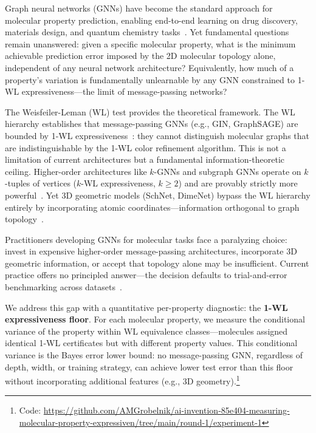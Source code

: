 \documentclass[11pt,letterpaper]{article}
\begin{document}
Graph neural networks (GNNs) have become the standard approach for molecular property prediction, enabling end-to-end learning on drug discovery, materials design, and quantum chemistry tasks~\citep{Gilmer2017}. Yet fundamental questions remain unanswered: given a specific molecular property, what is the minimum achievable prediction error imposed by the 2D molecular topology alone, independent of any neural network architecture? Equivalently, how much of a property's variation is fundamentally unlearnable by any GNN constrained to 1-WL expressiveness---the limit of message-passing networks?

The Weisfeiler-Leman (WL) test provides the theoretical framework. The WL hierarchy establishes that message-passing GNNs (e.g., GIN, GraphSAGE) are bounded by 1-WL expressiveness~\citep{Xu2019,Kipf2017}: they cannot distinguish molecular graphs that are indistinguishable by the 1-WL color refinement algorithm. This is not a limitation of current architectures but a fundamental information-theoretic ceiling. Higher-order architectures like $k$-GNNs and subgraph GNNs operate on $k$-tuples of vertices ($k$-WL expressiveness, $k \geq 2$) and are provably strictly more powerful~\citep{Maron2019,Frasca2022}. Yet 3D geometric models (SchNet, DimeNet) bypass the WL hierarchy entirely by incorporating atomic coordinates---information orthogonal to graph topology~\citep{Schutt2017,Gasteiger2020}.

Practitioners developing GNNs for molecular tasks face a paralyzing choice: invest in expensive higher-order message-passing architectures, incorporate 3D geometric information, or accept that topology alone may be insufficient. Current practice offers no principled answer---the decision defaults to trial-and-error benchmarking across datasets~\citep{Wu2021}.

We address this gap with a quantitative per-property diagnostic: the \textbf{1-WL expressiveness floor}. For each molecular property, we measure the conditional variance of the property within WL equivalence classes---molecules assigned identical 1-WL certificates but with different property values. This conditional variance is the Bayes error lower bound: no message-passing GNN, regardless of depth, width, or training strategy, can achieve lower test error than this floor without incorporating additional features (e.g., 3D geometry).\footnote{Code: \url{https://github.com/AMGrobelnik/ai-invention-85e404-measuring-molecular-property-expressiven/tree/main/round-1/experiment-1}}
\end{document}
